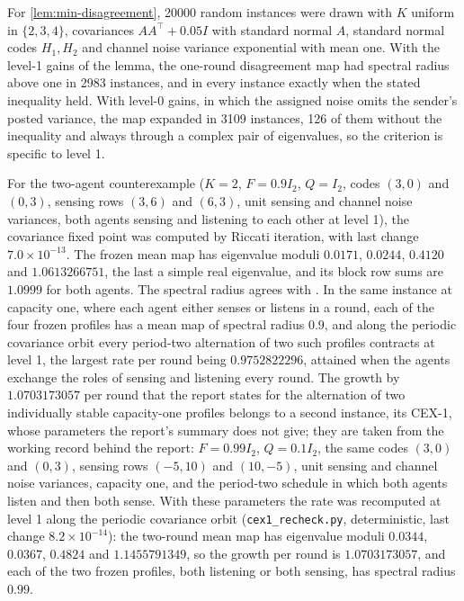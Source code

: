 \begin{numcheck}\label{chk:min-disagreement}
For \cref{lem:min-disagreement}, 20000 random instances were drawn with $K$ uniform in $\{2,3,4\}$, covariances $AA^\top+0.05I$ with standard normal $A$, standard normal codes $H_1,H_2$ and channel noise variance exponential with mean one. With the level-1 gains of the lemma, the one-round disagreement map had spectral radius above one in 2983 instances, and in every instance exactly when the stated inequality held. With level-0 gains, in which the assigned noise omits the sender's posted variance, the map expanded in 3109 instances, 126 of them without the inequality and always through a complex pair of eigenvalues, so the criterion is specific to level 1.
\end{numcheck}

\begin{numcheck}\label{chk:min-amplification}
For the two-agent counterexample ($K=2$, $F=0.9I_2$, $Q=I_2$, codes $(3,0)$ and $(0,3)$, sensing rows $(3,6)$ and $(6,3)$, unit sensing and channel noise variances, both agents sensing and listening to each other at level 1), the covariance fixed point was computed by Riccati iteration, with last change $7.0\times10^{-13}$. The frozen mean map has eigenvalue moduli $0.0171$, $0.0244$, $0.4120$ and $1.0613266751$, the last a simple real eigenvalue, and its block row sums are $1.0999$ for both agents. The spectral radius agrees with \citet{dennis2026communicating}. In the same instance at capacity one, where each agent either senses or listens in a round, each of the four frozen profiles has a mean map of spectral radius $0.9$, and along the periodic covariance orbit every period-two alternation of two such profiles contracts at level 1, the largest rate per round being $0.9752822296$, attained when the agents exchange the roles of sensing and listening every round. The growth by $1.0703173057$ per round that the report states for the alternation of two individually stable capacity-one profiles belongs to a second instance, its CEX-1, whose parameters the report's summary does not give; they are taken from the working record behind the report: $F=0.99I_2$, $Q=0.1I_2$, the same codes $(3,0)$ and $(0,3)$, sensing rows $(-5,10)$ and $(10,-5)$, unit sensing and channel noise variances, capacity one, and the period-two schedule in which both agents listen and then both sense. With these parameters the rate was recomputed at level 1 along the periodic covariance orbit (\texttt{cex1\_recheck.py}, deterministic, last change $8.2\times10^{-14}$): the two-round mean map has eigenvalue moduli $0.0344$, $0.0367$, $0.4824$ and $1.1455791349$, so the growth per round is $1.0703173057$, and each of the two frozen profiles, both listening or both sensing, has spectral radius $0.99$.
\end{numcheck}

